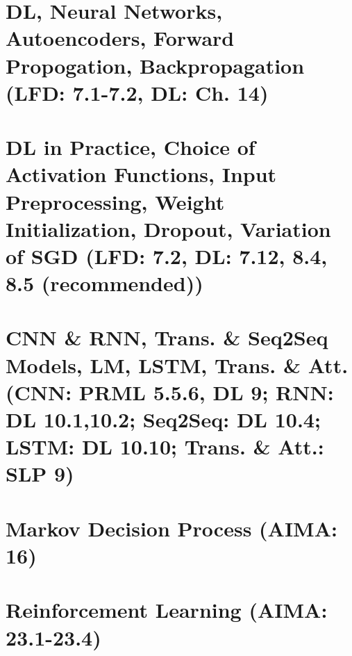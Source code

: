 \documentclass{article}
\begin{document}
\section{DL, Neural Networks, Autoencoders, Forward Propogation, Backpropagation (LFD: 7.1-7.2, DL: Ch. 14)}

\newpage

\section{DL in Practice, Choice of Activation Functions, Input Preprocessing, Weight Initialization, Dropout, Variation of SGD (LFD: 7.2, DL: 7.12, 8.4, 8.5 (recommended))}

\newpage

\section{CNN \& RNN, Trans. \& Seq2Seq Models, LM, LSTM, Trans. \& Att. (CNN: PRML 5.5.6, DL 9; RNN: DL 10.1,10.2; Seq2Seq: DL 10.4; LSTM: DL 10.10; Trans. \& Att.: SLP 9)}

\newpage

\section{Markov Decision Process (AIMA: 16)}

\newpage

\section{Reinforcement Learning (AIMA: 23.1-23.4)}

\newpage
\end{document}
